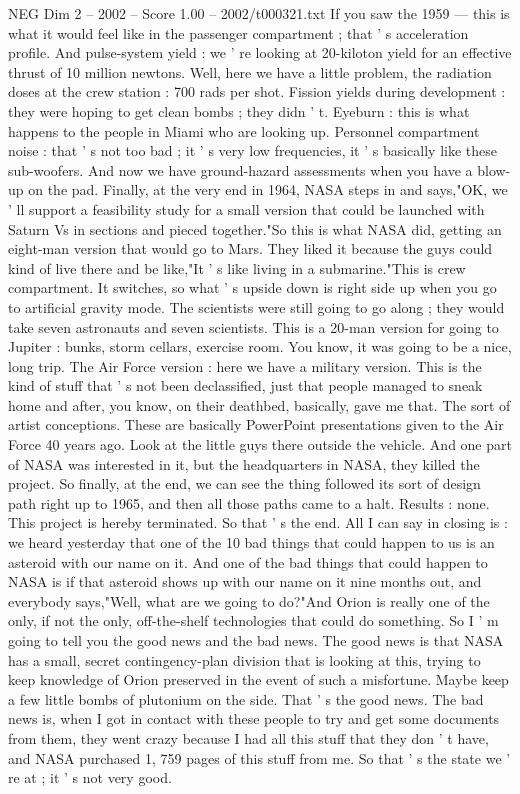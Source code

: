 \begin{textsample}{NEG Dim 2 – 2002 – Score 1.00 – 2002/t000321.txt}
If you saw the 1959 — this is what it would feel like in the passenger compartment ; that ' s acceleration profile.
And pulse-system yield : we ' re looking at 20-kiloton yield for an effective thrust of 10 million newtons.
Well, here we have a little problem, the radiation doses at the crew station : 700 rads per shot.
Fission yields during development : they were hoping to get clean bombs ; they didn ' t.
Eyeburn : this is what happens to the people in Miami who are looking up.
Personnel compartment noise : that ' s not too bad ; it ' s very low frequencies, it ' s basically like these sub-woofers.
And now we have ground-hazard assessments when you have a blow-up on the pad.
Finally, at the very end in 1964, NASA steps in and says,"OK, we ' ll support a feasibility study for a small version that could be launched with Saturn Vs in sections and pieced together."So this is what NASA did, getting an eight-man version that would go to Mars.
They liked it because the guys could kind of live there and be like,"It ' s like living in a submarine."This is crew compartment.
It switches, so what ' s upside down is right side up when you go to artificial gravity mode.
The scientists were still going to go along ; they would take seven astronauts and seven scientists.
This is a 20-man version for going to Jupiter : bunks, storm cellars, exercise room.
You know, it was going to be a nice, long trip.
The Air Force version : here we have a military version.
This is the kind of stuff that ' s not been declassified, just that people managed to sneak home and after, you know, on their deathbed, basically, gave me that.
The sort of artist conceptions.
These are basically PowerPoint presentations given to the Air Force 40 years ago.
Look at the little guys there outside the vehicle.
And one part of NASA was interested in it, but the headquarters in NASA, they killed the project.
So finally, at the end, we can see the thing followed its sort of design path right up to 1965, and then all those paths came to a halt.
Results : none.
This project is hereby terminated.
So that ' s the end.
All I can say in closing is : we heard yesterday that one of the 10 bad things that could happen to us is an asteroid with our name on it.
And one of the bad things that could happen to NASA is if that asteroid shows up with our name on it nine months out, and everybody says,"Well, what are we going to do?"And Orion is really one of the only, if not the only, off-the-shelf technologies that could do something.
So I ' m going to tell you the good news and the bad news.
The good news is that NASA has a small, secret contingency-plan division that is looking at this, trying to keep knowledge of Orion preserved in the event of such a misfortune.
Maybe keep a few little bombs of plutonium on the side.
That ' s the good news.
The bad news is, when I got in contact with these people to try and get some documents from them, they went crazy because I had all this stuff that they don ' t have, and NASA purchased 1, 759 pages of this stuff from me.
So that ' s the state we ' re at ; it ' s not very good.

\end{textsample}
